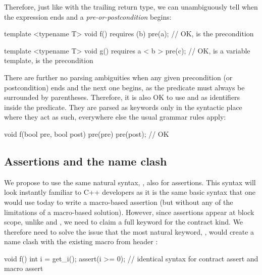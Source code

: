 Therefore, just like with the trailing return type, we can unambiguously tell when the expression ends and a \emph{pre-or-postcondition} begins:

\vspace{2mm}
\begin{codeblock}
template <typename T>
void f() requires (b) pre(a);   // OK,  is the precondition

template <typename T>
void g() requires a < b > pre(c);   // OK,  is a variable template,  is the precondition
\end{codeblock}
\vspace{2mm}

There are further no parsing ambiguities when any given precondition (or postcondition) ends and the next one begins, as the predicate must always be surrounded by parentheses. Therefore, it is also OK to use  and  as identifiers inside the predicate. They are parsed as keywords only in the syntactic place where they act as such, everywhere else the usual grammar rules apply:

\vspace{2mm}
\begin{codeblock}
void f(bool pre, bool post)
  pre(pre) pre(post);   // OK
\end{codeblock}
\vspace{2mm}


\subsection{Assertions and the  name clash}
\label{subsec:assrt}

We propose to use the same natural syntax, , also for assertions. This syntax will look instantly familiar to C++ developers as it is the same basic syntax that one would use today to write a macro-based assertion (but without any of the limitations of a macro-based solution). However, since assertions appear at block scope, unlike  and , we need to claim a full keyword for the contract kind. We therefore need to solve the issue that the most natural keyword, , would create a name clash with the existing  macro from header :

\vspace{2mm}
\begin{codeblock}
void f() {
  int i = get_i();
  assert(i >= 0);  // identical syntax for contract assert and macro assert
}
\end{codeblock}
\vspace{2mm}

